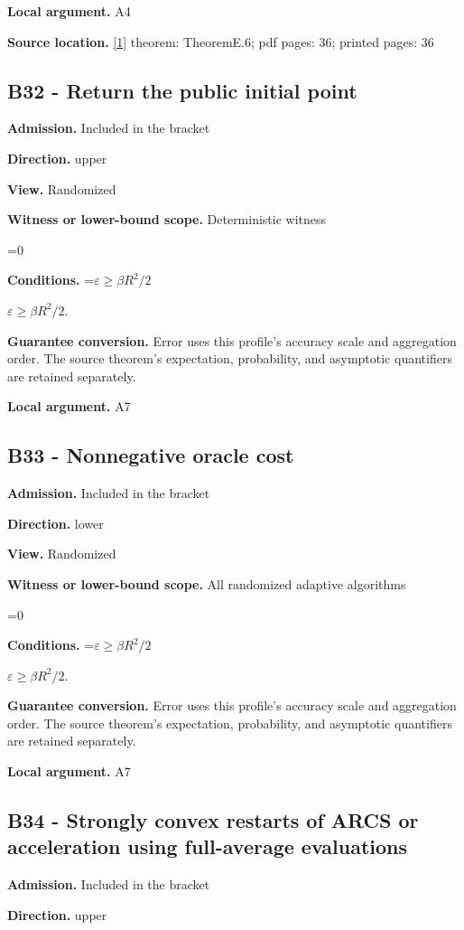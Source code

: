 \documentclass[10pt,a4paper]{article}
\newcommand{\AtlasMath}[1]{\par\begingroup\centering\setbox0=\hbox{$\displaystyle #1$}\ifdim\wd0>1.4\linewidth\typeout{ATLAS WIDE FORMULA: \the\wd0}\fi\ifdim\wd0>\linewidth\resizebox{\linewidth}{!}{\box0}\else\box0\fi\par\endgroup}
\newcommand{\AtlasInlineMath}[1]{\begingroup\setbox0=\hbox{$#1$}\ifdim\wd0>.4\linewidth\endgroup\AtlasMath{#1}\else\endgroup$#1$\fi}
\begin{document}
\textbf{Local argument.} A4

\textbf{Source location.} \href{https://arxiv.org/html/2610.00345v1}{[1]} theorem: TheoremE.6; pdf pages: 36; printed pages: 36

\subsection{B32 - Return the public initial point}
\textbf{Admission.} Included in the bracket

\textbf{Direction.} upper

\textbf{View.} Randomized

\textbf{Witness or lower-bound scope.} Deterministic witness

\AtlasMath{0}
\textbf{Conditions.} \AtlasInlineMath{\varepsilon\ge\beta R^2/2}.

\textbf{Guarantee conversion.} Error uses this profile's accuracy scale and aggregation order. The source theorem's expectation, probability, and asymptotic quantifiers are retained separately.

\textbf{Local argument.} A7

\subsection{B33 - Nonnegative oracle cost}
\textbf{Admission.} Included in the bracket

\textbf{Direction.} lower

\textbf{View.} Randomized

\textbf{Witness or lower-bound scope.} All randomized adaptive algorithms

\AtlasMath{0}
\textbf{Conditions.} \AtlasInlineMath{\varepsilon\ge\beta R^2/2}.

\textbf{Guarantee conversion.} Error uses this profile's accuracy scale and aggregation order. The source theorem's expectation, probability, and asymptotic quantifiers are retained separately.

\textbf{Local argument.} A7

\subsection{B34 - Strongly convex restarts of ARCS or acceleration using full-average evaluations}
\textbf{Admission.} Included in the bracket

\textbf{Direction.} upper
\end{document}
